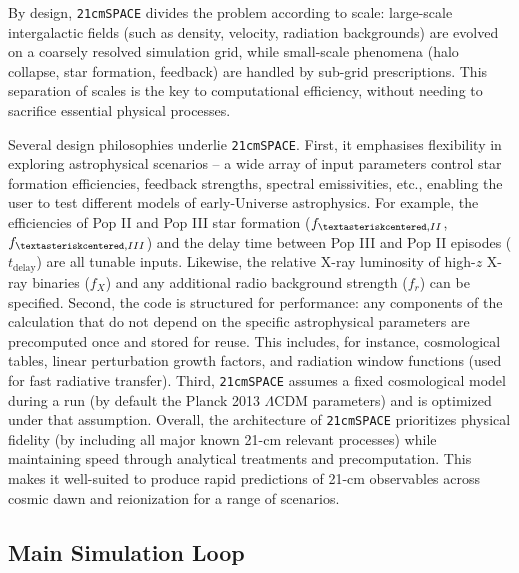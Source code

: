 \documentclass[floats,floatfix,showpacs,amssymb,prd,superscriptaddress,nofootinbib]{revtex4-2} %
\newcommand{\code}{\texttt}
\newcommand{\red}{\textcolor{red}}
\begin{document}
By design, \code{21cmSPACE} divides the problem according to scale: large-scale intergalactic fields (such as density, velocity, radiation backgrounds) are evolved on a coarsely resolved simulation grid, while small-scale phenomena (halo collapse, star formation, feedback) are handled by sub-grid prescriptions. 
This separation of scales is the key to computational efficiency, without needing to sacrifice essential physical processes.

Several design philosophies underlie \code{21cmSPACE}. First, it emphasises flexibility in exploring astrophysical scenarios -- a wide array of input parameters
control star formation efficiencies, feedback strengths, spectral emissivities, etc., enabling the user to test different models of early-Universe astrophysics. For example, the efficiencies of Pop II  and Pop III star formation ($f_{\textasteriskcentered,II}$, $f_{\textasteriskcentered,III}$) and the delay time between Pop III and Pop II episodes ($t_{\text{delay}}$) are all tunable inputs. Likewise, the relative X-ray luminosity of high-$z$ X-ray binaries ($f_X$) and any additional radio background strength ($f_r$) can be specified. Second, the code is structured for performance: any components of the calculation that do not depend on the specific astrophysical parameters are precomputed once and stored for reuse. This includes, for instance, cosmological tables, linear perturbation growth factors, and radiation window functions (used for fast radiative transfer). Third, \code{21cmSPACE} assumes a fixed cosmological model during a run (by default the Planck 2013 $\Lambda$CDM parameters) and is optimized under that assumption. 
Overall, the architecture of \code{21cmSPACE} prioritizes physical fidelity (by including all major known 21-cm relevant processes) while maintaining speed through analytical treatments and precomputation. This makes it well-suited to produce rapid predictions of 21-cm observables across cosmic dawn and reionization for a range of scenarios.


\subsection{Main Simulation Loop}
\end{document}
